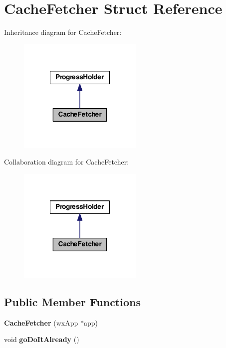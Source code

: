 \hypertarget{struct_cache_fetcher}{\section{Cache\-Fetcher Struct Reference}
\label{struct_cache_fetcher}
}


Inheritance diagram for Cache\-Fetcher\-:
\nopagebreak
\begin{figure}[H]
\begin{center}
\leavevmode
\includegraphics[width=168pt]{struct_cache_fetcher__inherit__graph}
\end{center}
\end{figure}


Collaboration diagram for Cache\-Fetcher\-:
\nopagebreak
\begin{figure}[H]
\begin{center}
\leavevmode
\includegraphics[width=168pt]{struct_cache_fetcher__coll__graph}
\end{center}
\end{figure}
\subsection*{Public Member Functions}
\begin{DoxyCompactItemize}
\item 
\hypertarget{struct_cache_fetcher_abb040b6dad48853c48e7b0cd34e42ebf}{{\bfseries Cache\-Fetcher} (wx\-App $\ast$app)}\label{struct_cache_fetcher_abb040b6dad48853c48e7b0cd34e42ebf}

\item 
\hypertarget{struct_cache_fetcher_a63555c553b64215451c7309d587ef870}{void {\bfseries go\-Do\-It\-Already} ()}\label{struct_cache_fetcher_a63555c553b64215451c7309d587ef870}

\end{DoxyCompactItemize}


